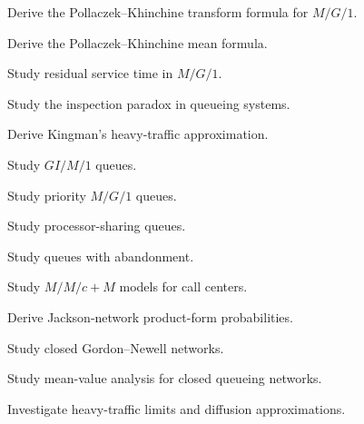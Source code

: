 \begin{exercise}[4]
Derive the Pollaczek--Khinchine transform formula for \(M/G/1\).
\end{exercise}

\begin{exercise}[4]
Derive the Pollaczek--Khinchine mean formula.
\end{exercise}

\begin{exercise}[4]
Study residual service time in \(M/G/1\).
\end{exercise}

\begin{exercise}[4]
Study the inspection paradox in queueing systems.
\end{exercise}

\begin{exercise}[4]
Derive Kingman's heavy-traffic approximation.
\end{exercise}

\begin{exercise}[4]
Study \(GI/M/1\) queues.
\end{exercise}

\begin{exercise}[4]
Study priority \(M/G/1\) queues.
\end{exercise}

\begin{exercise}[4]
Study processor-sharing queues.
\end{exercise}

\begin{exercise}[4]
Study queues with abandonment.
\end{exercise}

\begin{exercise}[4]
Study \(M/M/c+M\) models for call centers.
\end{exercise}

\begin{exercise}[4]
Derive Jackson-network product-form probabilities.
\end{exercise}

\begin{exercise}[4]
Study closed Gordon--Newell networks.
\end{exercise}

\begin{exercise}[4]
Study mean-value analysis for closed queueing networks.
\end{exercise}

\begin{exercise}[4]
Investigate heavy-traffic limits and diffusion approximations.
\end{exercise}

